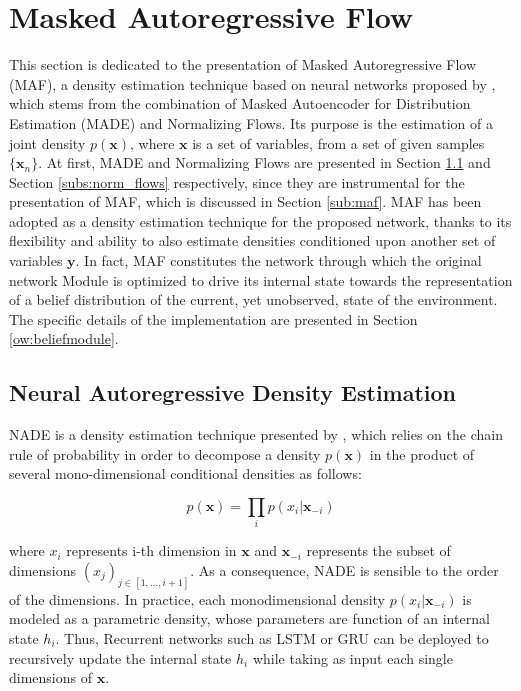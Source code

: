     \section{Masked Autoregressive Flow}
        \label{prel:maf}
        This section is dedicated to the presentation of Masked Autoregressive Flow (MAF), a density estimation technique based on neural networks proposed by , which stems from the combination of Masked Autoencoder for Distribution Estimation (MADE) and Normalizing Flows. Its purpose is the estimation of a joint density $p(\mathbf{x})$, where $\mathbf{x}$ is a set of variables, from a set of given samples $\{ \mathbf{x}_n \}$. At first, MADE and Normalizing Flows are presented in Section \ref{subs:nade} and Section \ref{subs:norm_flows} respectively, since they are instrumental for the presentation of MAF, which is discussed in Section \ref{sub:maf}. \newline
        MAF has been adopted as a density estimation technique for the proposed network, thanks to its flexibility and ability to also estimate densities conditioned upon another set of variables $\mathbf{y}$. In fact, MAF constitutes the network through which the original network Module is optimized to drive its internal state towards the representation of a belief distribution of the current, yet unobserved, state of the environment. The specific details of the implementation are presented in Section \ref{ow:beliefmodule}.
        
        \subsection{Neural Autoregressive Density Estimation}
        \label{subs:nade}
            NADE is a density estimation technique presented by , which relies on the chain rule of probability in order to decompose a density $p(\mathbf{x})$ in the product of several mono-dimensional conditional densities as follows:
            
            \[ p(\mathbf{x}) = \prod_{i} p(x_i | \mathbf{x}_{-i} ) \]
            
            where $x_i$ represents i-th dimension in $\mathbf{x}$ and $\mathbf{x}_{-i}$ represents the subset of dimensions  $(x_j)_{j\in[1,\dots,i+1]}$. As a consequence, NADE is sensible to the order of the dimensions. In practice, each monodimensional density $p(x_i | \mathbf{x}_{-i} )$ is modeled as a parametric density, whose parameters are function of an internal state $h_i$. Thus, Recurrent networks such as LSTM or GRU can be deployed to recursively update the internal state $h_i$ while taking as input each single dimensions of $\mathbf{x}$.
            
